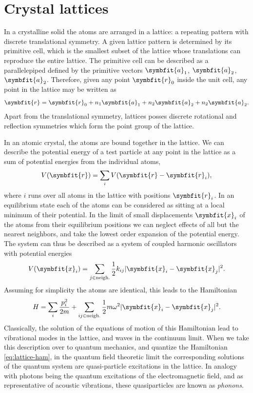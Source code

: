 \documentclass[b5paper, 10pt, twoside]{book}
\renewcommand{\vec}[1]{\symbfit{#1}}
\begin{document}
\section{Crystal lattices}

In a crystalline solid the atoms are arranged in a lattice: a repeating pattern with discrete translational symmetry. A given lattice pattern is determined by its primitive cell, which is the smallest subset of the lattice whose translations can reproduce the entire lattice. The primitive cell can be described as a parallelepiped defined by the primitive vectors $\vec{a}_1$, $\vec{a}_2$, $\vec{a}_2$. Therefore, given any point $\vec{r}_0$ inside the unit cell, any point in the lattice may be written as
\begin{equation}
    \vec{r}=\vec{r}_0+n_1\vec{a}_1+n_2\vec{a}_2+n_2\vec{a}_2.
\end{equation}
Apart from the translational symmetry, lattices posses discrete rotational and reflection symmetries which form the point group of the lattice.

In an atomic crystal, the atoms are bound together in the lattice. We can describe the potential energy of a test particle at any point in the lattice as a sum of potential energies from the individual atoms,
\begin{equation}
    V(\vec{r})=\sum_iV(\vec{r}-\vec{r}_i),
    \label{eq:crystal-atom-pe}
\end{equation}
where $i$ runs over all atoms in the lattice with positions $\vec{r}_i$. In an equilibrium state each of the atoms can be considered as sitting at a local minimum of their potential. In the limit of small displacements $\vec{x}_i$ of the atoms from their equilibrium positions we can neglect effects of all but the nearest neighbors, and take the lowest order expansion of the potential energy. The system can thus be described as a system of coupled harmonic oscillators with potential energies
\begin{equation}
    V(\vec{x}_i)=\sum_{j\in\text{neigh.}}\frac{1}{2}k_{ij}|\vec{x}_i-\vec{x}_j|^2.
\end{equation}
Assuming for simplicity the atoms are identical, this leads to the Hamiltonian
\begin{equation}
    H=\sum_i\frac{p_i^2}{2m}+\sum_{ij\in\text{neigh.}}\frac{1}{2}m\omega^2|\vec{x}_i-\vec{x}_j|^2.
    \label{eq:lattice-ham}
\end{equation}
Classically, the solution of the equations of motion of this Hamiltonian lead to vibrational modes in the lattice, and waves in the continuum limit. When we take this description over to quantum mechanics, and quantize the Hamiltonian \eqref{eq:lattice-ham}, in the quantum field theoretic limit the corresponding solutions of the quantum system are quasi-particle excitations in the lattice. In analogy with photons being the quantum excitations of the electromagnetic field, and as representative of acoustic vibrations, these quasiparticles are known as \emph{phonons}.
\end{document}
